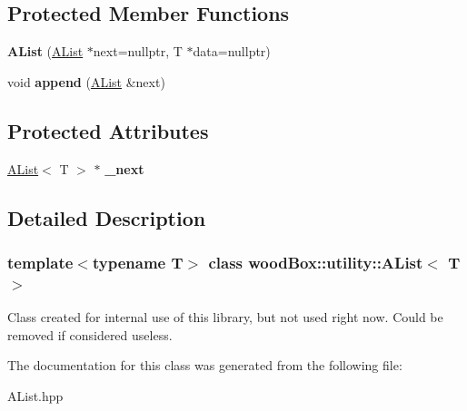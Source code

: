 \subsection*{Protected Member Functions}
\begin{DoxyCompactItemize}
\item 
\mbox{\label{classwood_box_1_1utility_1_1_a_list_a333eb2d9fa6833bba6675e2b5964ee4f}} 
{\bfseries A\+List} (\mbox{\hyperlink{classwood_box_1_1utility_1_1_a_list}{A\+List}} $\ast$next=nullptr, T $\ast$data=nullptr)
\item 
\mbox{\label{classwood_box_1_1utility_1_1_a_list_adc24a832d3c7446cf1958eb9acfeb49b}} 
void {\bfseries append} (\mbox{\hyperlink{classwood_box_1_1utility_1_1_a_list}{A\+List}} \&next)
\end{DoxyCompactItemize}
\subsection*{Protected Attributes}
\begin{DoxyCompactItemize}
\item 
\mbox{\label{classwood_box_1_1utility_1_1_a_list_a843caa997ee9f3339b7e2b804acd11b7}} 
\mbox{\hyperlink{classwood_box_1_1utility_1_1_a_list}{A\+List}}$<$ T $>$ $\ast$ {\bfseries \+\_\+next}
\end{DoxyCompactItemize}


\subsection{Detailed Description}
\subsubsection*{template$<$typename T$>$\newline
class wood\+Box\+::utility\+::\+A\+List$<$ T $>$}

Class created for internal use of this library, but not used right now. Could be removed if considered useless. 

The documentation for this class was generated from the following file\+:\begin{DoxyCompactItemize}
\item 
A\+List.\+hpp\end{DoxyCompactItemize}
